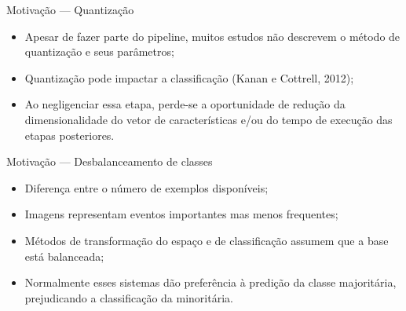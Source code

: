\documentclass{beamer}
\begin{document}
\begin{frame}{Motivação --- Quantização}
  \setlength\leftmargini{1em}
  \justifying
  \begin{itemize}
    \justifying
    \item Apesar de fazer parte do pipeline, muitos estudos não descrevem o método de quantização e seus parâmetros;
    \item Quantização pode impactar a classificação (Kanan e Cottrell, 2012);
    \item Ao negligenciar essa etapa, perde-se a oportunidade de redução da dimensionalidade do vetor de características e/ou do tempo de execução das etapas posteriores.
  \end{itemize}
\end{frame}
\begin{frame}{Motivação --- Desbalanceamento de classes}
  \setlength\leftmargini{1em}
  \justifying
  \begin{itemize}
    \item Diferença entre o número de exemplos disponíveis;
    \item Imagens representam eventos importantes mas menos frequentes;
    \item Métodos de transformação do espaço e de
    classificação assumem que a base está balanceada;
    \item Normalmente esses sistemas dão preferência à predição da classe majoritária, prejudicando a classificação da minoritária.
  \end{itemize}
\end{frame}
\end{document}
